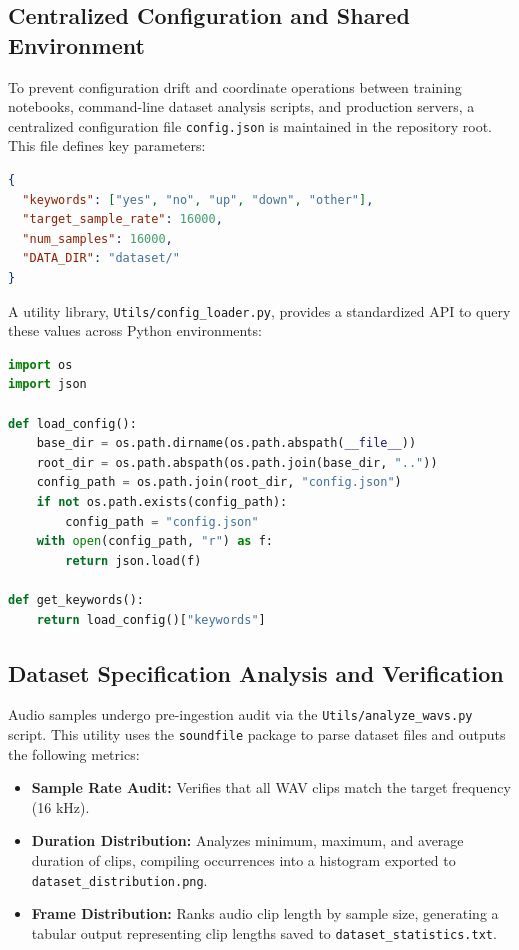 \subsection{Centralized Configuration and Shared Environment}
To prevent configuration drift and coordinate operations between training notebooks, command-line dataset analysis scripts, and production servers, a centralized configuration file \texttt{config.json} is maintained in the repository root. This file defines key parameters:
\begin{lstlisting}[language=json, caption={Repository config.json Configuration Schema}]
{
  "keywords": ["yes", "no", "up", "down", "other"],
  "target_sample_rate": 16000,
  "num_samples": 16000,
  "DATA_DIR": "dataset/"
}
\end{lstlisting}

A utility library, \texttt{Utils/config\_loader.py}, provides a standardized API to query these values across Python environments:
\begin{lstlisting}[language=Python, caption={Utility Configuration Loader}]
import os
import json

def load_config():
    base_dir = os.path.dirname(os.path.abspath(__file__))
    root_dir = os.path.abspath(os.path.join(base_dir, ".."))
    config_path = os.path.join(root_dir, "config.json")
    if not os.path.exists(config_path):
        config_path = "config.json"
    with open(config_path, "r") as f:
        return json.load(f)

def get_keywords():
    return load_config()["keywords"]
\end{lstlisting}

\subsection{Dataset Specification Analysis and Verification}
Audio samples undergo pre-ingestion audit via the \texttt{Utils/analyze\_wavs.py} script. This utility uses the \texttt{soundfile} package to parse dataset files and outputs the following metrics:
\begin{itemize}
    \item \textbf{Sample Rate Audit:} Verifies that all WAV clips match the target frequency (16 kHz).
    \item \textbf{Duration Distribution:} Analyzes minimum, maximum, and average duration of clips, compiling occurrences into a histogram exported to \texttt{dataset\_distribution.png}.
    \item \textbf{Frame Distribution:} Ranks audio clip length by sample size, generating a tabular output representing clip lengths saved to \texttt{dataset\_statistics.txt}.
\end{itemize}

